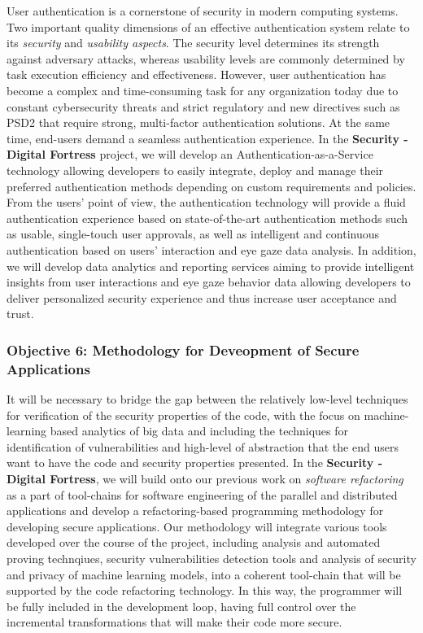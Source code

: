 \documentclass[a4paper,11pt]{article}
\newcommand{\project}[1]{\textbf{#1}\xspace}
\newcommand{\SECURITY}{\project{Security - Digital Fortress}}
\newcommand{\TheProject}{\SECURITY}
\begin{document}
User authentication is a cornerstone of security in modern computing systems. Two important quality dimensions of an effective authentication system relate to its \textit{security} and \textit{usability aspects}. The security level determines its strength against adversary attacks, whereas usability levels are commonly determined by task execution efficiency and effectiveness. However, user authentication has become a complex and time-consuming task for any organization today due to constant cybersecurity threats and strict regulatory and new directives such as PSD2 that require strong, multi-factor authentication solutions. At the same time, end-users demand a seamless authentication experience. In the \TheProject{} project, we will develop an Authentication-as-a-Service technology allowing developers to easily integrate, deploy and manage their preferred authentication methods depending on custom requirements and policies. From the users’ point of view, the authentication technology will provide a fluid authentication experience based on state-of-the-art authentication methods such as usable, single-touch user approvals, as well as intelligent and continuous authentication based on users' interaction and eye gaze data analysis. In addition, we will develop data analytics and reporting services aiming to provide intelligent insights from user interactions and eye gaze behavior data allowing developers to deliver personalized security experience and thus increase user acceptance and trust.

\subsubsection*{Objective 6: Methodology for Deveopment of Secure Applications}
\vspace{-6pt}

It will be necessary to bridge the gap between the relatively low-level techniques for verification of the security properties of the code, with the focus on machine-learning based analytics of big data and including the techniques for identification of vulnerabilities and high-level of abstraction that the end users want to have the code and security properties presented. In the \TheProject{}, we will build onto our previous work on \emph{software refactoring} as a part of tool-chains for software engineering of the parallel and distributed applications and develop a refactoring-based programming methodology for developing secure applications. Our methodology will integrate various tools developed over the course of the project, including analysis and automated proving technqiues, security vulnerabilities detection tools and analysis of security and privacy of machine learning models, into a coherent tool-chain that will be supported by the code refactoring technology. In this way, the programmer will be fully included in the development loop, having full control over the incremental transformations that will make their code more secure.
\end{document}
